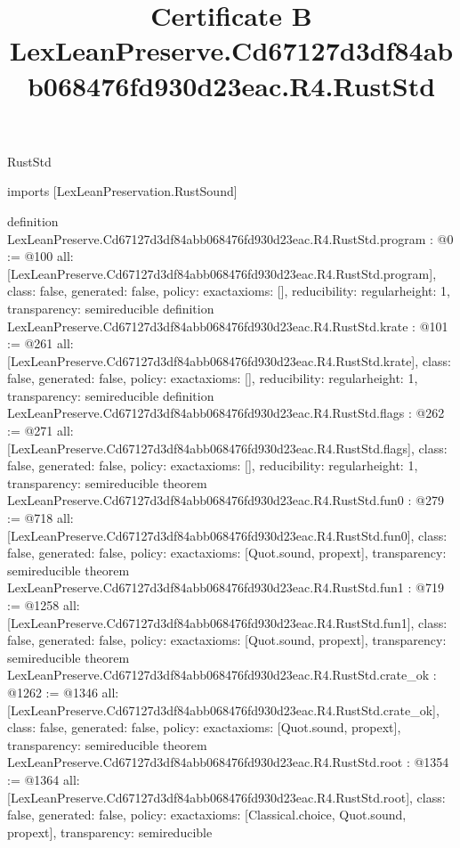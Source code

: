 \begin{lexlean}{RustStd}
\title{Certificate B LexLeanPreserve.Cd67127d3df84abb068476fd930d23eac.R4.RustStd}
\begin{coremodule}
imports [LexLeanPreservation.RustSound]

definition LexLeanPreserve.Cd67127d3df84abb068476fd930d23eac.R4.RustStd.program : @0 := @100 {
  all: [LexLeanPreserve.Cd67127d3df84abb068476fd930d23eac.R4.RustStd.program],
  class: false,
  generated: false,
  policy: exact{axioms: []},
  reducibility: regular{height: 1},
  transparency: semireducible
}
definition LexLeanPreserve.Cd67127d3df84abb068476fd930d23eac.R4.RustStd.krate : @101 := @261 {
  all: [LexLeanPreserve.Cd67127d3df84abb068476fd930d23eac.R4.RustStd.krate],
  class: false,
  generated: false,
  policy: exact{axioms: []},
  reducibility: regular{height: 1},
  transparency: semireducible
}
definition LexLeanPreserve.Cd67127d3df84abb068476fd930d23eac.R4.RustStd.flags : @262 := @271 {
  all: [LexLeanPreserve.Cd67127d3df84abb068476fd930d23eac.R4.RustStd.flags],
  class: false,
  generated: false,
  policy: exact{axioms: []},
  reducibility: regular{height: 1},
  transparency: semireducible
}
theorem LexLeanPreserve.Cd67127d3df84abb068476fd930d23eac.R4.RustStd.fun0 : @279 := @718 {
  all: [LexLeanPreserve.Cd67127d3df84abb068476fd930d23eac.R4.RustStd.fun0],
  class: false,
  generated: false,
  policy: exact{axioms: [Quot.sound, propext]},
  transparency: semireducible
}
theorem LexLeanPreserve.Cd67127d3df84abb068476fd930d23eac.R4.RustStd.fun1 : @719 := @1258 {
  all: [LexLeanPreserve.Cd67127d3df84abb068476fd930d23eac.R4.RustStd.fun1],
  class: false,
  generated: false,
  policy: exact{axioms: [Quot.sound, propext]},
  transparency: semireducible
}
theorem LexLeanPreserve.Cd67127d3df84abb068476fd930d23eac.R4.RustStd.crate_ok : @1262 := @1346 {
  all: [LexLeanPreserve.Cd67127d3df84abb068476fd930d23eac.R4.RustStd.crate_ok],
  class: false,
  generated: false,
  policy: exact{axioms: [Quot.sound, propext]},
  transparency: semireducible
}
theorem LexLeanPreserve.Cd67127d3df84abb068476fd930d23eac.R4.RustStd.root : @1354 := @1364 {
  all: [LexLeanPreserve.Cd67127d3df84abb068476fd930d23eac.R4.RustStd.root],
  class: false,
  generated: false,
  policy: exact{axioms: [Classical.choice, Quot.sound, propext]},
  transparency: semireducible
}


\end{coremodule}
\end{lexlean}
